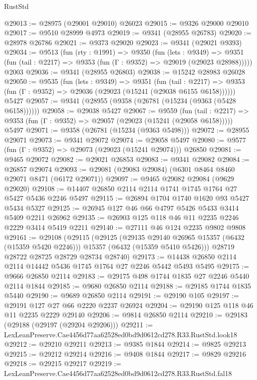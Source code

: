 \begin{lexlean}{RustStd}
\begin{coremodule}
@29013 := @28975 (@29001 @29010) @26023
@29015 := @9326 @29000 @29010
@29017 := @9510 @28999 @4973
@29019 := @9341 (@28955 @26783)
@29020 := @28978 @26786
@29021 := @9373 @29020
@29023 := @9341 (@29021 @9393)
@29034 := @9513
    (fun (rty : @1991) =>
    @9350
      (fun (lets : @9349) =>
      @9351 (fun (tail : @2217) => @9353 (fun (Γ : @9352) => @29019 (@29023 @28988)))))
    @2003
@29036 := @9341 (@28955 @26803)
@29038 := @15242 @28983 @26028
@29050 := @9535
    (fun (lets : @9349) =>
    @9351
      (fun (tail : @2217) =>
      @9353 (fun (Γ : @9352) => @29036 (@29023 (@15241 (@29038 @6155 @6158))))))
    @5427
@29057 := @9341 (@28955 (@9358 (@26781 (@15234 (@9363 (@5428 @6158))))))
@29058 := @29038 @5427
@29067 := @9559
    (fun (tail : @2217) => @9353 (fun (Γ : @9352) => @29057 (@29023 (@15241 (@29058 @6158)))))
    @5497
@29071 := @9358 (@26781 (@15234 (@9363 @5498)))
@29072 := @28955 @29071
@29073 := @9341 @29072
@29074 := @29058 @5497
@29080 := @9577 (fun (Γ : @9352) => @29073 (@29023 (@15241 @29074))) @26850
@29081 := @9465 @29072
@29082 := @29021 @26853
@29083 := @9341 @29082
@29084 := @26857 @29074
@29093 := @29081 (@29083 @29084) (@6301 @8464 @8460 @29071 @8471 (@6172 @29071))
@29097 := @9465 @29082 @29084 (@9629 @29020)
@29108 := @14407 @26850 @2114 @2114 @1741 @1745 @1764 @27 @5427 @5436 @2246 @5497
@29115 := @26894 @1704 @1740 @1620 @93 @5427 @5434 @5327
@29125 := @26945 @127 @46 @66 @4797 @5426 @5433 @3414 @5409 @2211 @26962
@29135 := @26903 @125 @118 @46 @11 @2235 @2246 @2229 @3414 @5419 @2211
@29140 := @27111 @46 @124 @2235 @9802 @9808
@29161 := @29108
    (@29115
      (@29125
        (@29135 @29140 @26965 @15357 (@6432 (@15359 @5420 @2246)))
        @15357
        (@6432 (@15359 @5410 @5426)))
      @28719
      @28722
      @28725
      @28729
      @28734
      @28740)
@29173 := @14438 @26850 @2114 @2114 @14442 @5436 @1745 @1764 @27 @2246 @5442 @5493 @5495
@29175 := @9666 @26850 @2114
@29183 := @29175 @498 @1744 @1835 @27 @2246 @5440 @2114 @1844
@29185 := @9680 @26850 @2114
@29188 := @29185 @1744 @1835 @5440
@29190 := @9689 @26850 @2114
@29191 := @29190 @105
@29197 := @29191 @127 @27 @66 @2220 @2237 @26924
@29204 := @29190 @125 @118 @46 @11 @2235 @2229 @29140
@29206 := @9814 @26850 @2114
@29210 := @29183 (@29188 (@29197 (@29204 @29206)))
@29211 := LexLeanPreserve.Cae4456d77aa62528ed0bd9d0612cd278.R33.RustStd.look18
@29212 := @29210 @29211
@29213 := @9385 @1844
@29214 := @9825 @29213
@29215 := @29212 @29214
@29216 := @9408 @1844
@29217 := @9829 @29216
@29218 := @29215 @29217
@29219 := LexLeanPreserve.Cae4456d77aa62528ed0bd9d0612cd278.R33.RustStd.fal18

\end{coremodule}
\end{lexlean}
